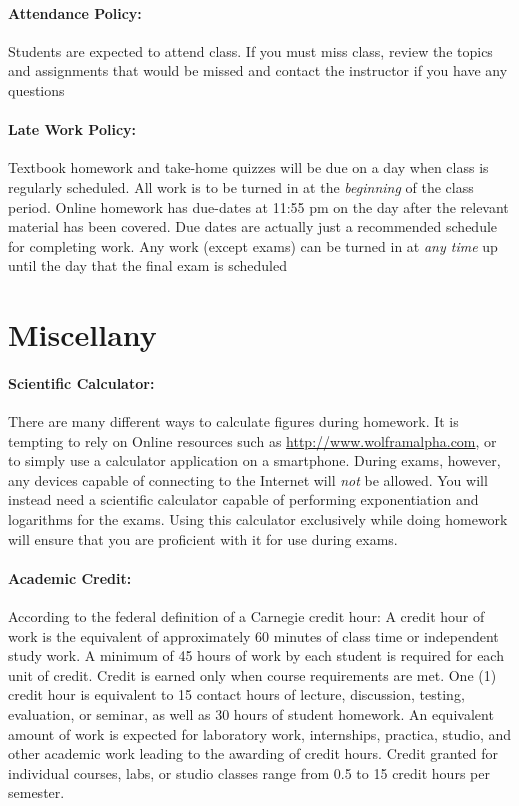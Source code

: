 \documentclass[12pt, letterpaper]{article}
\begin{document}
\paragraph{Attendance Policy:}
Students are expected to attend class. If you must miss class, review the topics and assignments that would be missed and contact the instructor if you have any questions

\paragraph{Late Work Policy:}
Textbook homework and take-home quizzes will be due on a day when class is regularly scheduled. All work is to be turned in at the \emph{beginning} of the class period. Online homework has due-dates at 11:55 pm on the day after the relevant material has been covered. Due dates are actually just a recommended schedule for completing work. Any work (except exams) can be turned in at \emph{any time} up until the day that the final exam is scheduled

\section*{Miscellany}

\paragraph{Scientific Calculator:}
There are many different ways to calculate figures during homework. It is tempting to rely on Online resources such as \href{http://www.wolframalpha.com}{http://www.wolframalpha.com}, or to simply use a calculator application on a smartphone. During exams, however, any devices capable of connecting to the Internet will \emph{not} be allowed. You will instead need a scientific calculator capable of performing exponentiation and logarithms for the exams. Using this calculator exclusively while doing homework will ensure that you are proficient with it for use during exams.

\paragraph{Academic Credit:}
According to the federal definition of a Carnegie credit hour: A credit hour of work is the equivalent of approximately 60 minutes of class time or independent study work. A minimum of 45 hours of work by each student is required for each unit of credit. Credit is earned only when course requirements are met. One (1) credit hour is equivalent to 15 contact hours of lecture, discussion, testing, evaluation, or seminar, as well as 30 hours of student homework. An equivalent amount of work is expected for laboratory work, internships, practica, studio, and other academic work leading to the awarding of credit hours. Credit granted for individual courses, labs, or studio classes range from 0.5 to 15 credit hours per semester.
\end{document}
